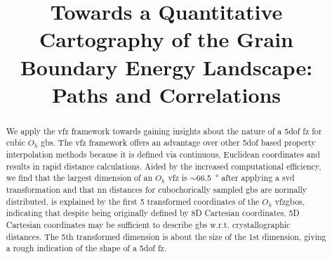 \documentclass[final,twocolumn,12pt]{elsarticle}
\begin{document}
	
	\sloppy %
	
	\begin{frontmatter}
		
        \title{Towards a Quantitative Cartography of the Grain Boundary Energy Landscape: Paths and Correlations}
		
		
		
		\begin{abstract}
			We apply the \gls{vfz} framework towards gaining insights about the nature of a \gls{5dof} \gls{fz} for cubic $O_h$ \glspl{gb}. The \gls{vfz} framework offers an advantage over other \gls{5dof} based property interpolation methods because it is defined via continuous, Euclidean coordinates and results in rapid distance calculations. %
			Aided by the increased computational efficiency, we find that the largest dimension of an $O_h$ \gls{vfz} is $\sim$\SI{66.5}{\degree} after applying a \gls{svd} transformation and that \gls{nn} distances for cubochorically sampled \glspl{gb} are normally distributed. \percExplained{} is explained by the first 5 transformed coordinates of the $O_h$ \glspl{vfzgbo}, indicating that despite being originally defined by 8D Cartesian coordinates, 5D Cartesian coordinates may be sufficient to describe \glspl{gb} w.r.t. crystallographic distances. The 5th transformed dimension is about \percFiveVsOne{} the size of the 1st dimension, giving a rough indication of the shape of a \gls{5dof} \gls{fz}. %

\end{abstract}
\end{frontmatter}
\end{document}
